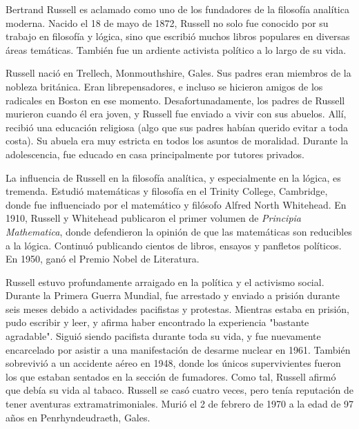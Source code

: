 \documentclass[../../../include/open-logic-section]{subfiles}
\begin{document}



Bertrand Russell es aclamado como uno de los fundadores de la filosofía analítica moderna. Nacido el 18 de mayo de 1872, Russell no solo fue conocido por su trabajo en filosofía y lógica, sino que escribió muchos libros populares en diversas áreas temáticas. También fue un ardiente activista político a lo largo de su vida.

Russell nació en Trellech, Monmouthshire, Gales. Sus padres eran miembros de la nobleza británica. Eran librepensadores, e incluso se hicieron amigos de los radicales en Boston en ese momento. Desafortunadamente, los padres de Russell murieron cuando él era joven, y Russell fue enviado a vivir con sus abuelos. Allí, recibió una educación religiosa (algo que sus padres habían querido evitar a toda costa). Su abuela era muy estricta en todos los asuntos de moralidad. Durante la adolescencia, fue educado en casa principalmente por tutores privados.

La influencia de Russell en la filosofía analítica, y especialmente en la lógica, es tremenda. Estudió matemáticas y filosofía en el Trinity College, Cambridge, donde fue influenciado por el matemático y filósofo Alfred North Whitehead. En 1910, Russell y Whitehead publicaron el primer volumen de \emph{Principia Mathematica}, donde defendieron la opinión de que las matemáticas son reducibles a la lógica. Continuó publicando cientos de libros, ensayos y panfletos políticos. En 1950, ganó el Premio Nobel de Literatura.

Russell estuvo profundamente arraigado en la política y el activismo social. Durante la Primera Guerra Mundial, fue arrestado y enviado a prisión durante seis meses debido a actividades pacifistas y protestas. Mientras estaba en prisión, pudo escribir y leer, y afirma haber encontrado la experiencia "bastante agradable". Siguió siendo pacifista durante toda su vida, y fue nuevamente encarcelado por asistir a una manifestación de desarme nuclear en 1961. También sobrevivió a un accidente aéreo en 1948, donde los únicos supervivientes fueron los que estaban sentados en la sección de fumadores. Como tal, Russell afirmó que debía su vida al tabaco. Russell se casó cuatro veces, pero tenía reputación de tener aventuras extramatrimoniales. Murió el 2 de febrero de 1970 a la edad de 97 años en Penrhyndeudraeth, Gales.
\end{document}
